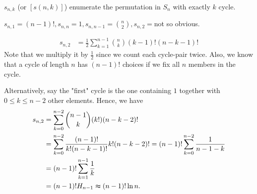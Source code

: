\begin{definition} \label{def: Stirling number for the first kind}
    \(s_{n, k}\) (or \([s(n, k)]\)) enumerate the permutation in \(S_n\) with exactly \(k\) cycle.   
\end{definition}

\begin{eg}
    \(s_{n, 1} = (n-1)!, s_{n,n} = 1, s_{n, n-1} = \binom{n}{2}, s_{n, 2} =\)not so obvious.
\end{eg}
\begin{explanation}
    \begin{align*}
        s_{n, 2} &= \frac{1}{2}\sum_{k=1}^{n-1} \binom{n}{k}(k-1)!(n-k-1)! 
    \end{align*}
    Note that we multiply it by \(\frac{1}{2}\) since we count each cycle-pair twice. Also, we know that a cycle of length \(n\) has \((n-1)!\) choices if we fix all \(n\) members in the cycle.   
    
    Alternatively, say the "first" cycle is the one containing \(1\) together with \(0 \le k \le n-2\) other elements. Hence, we have 
    \begin{align*}
        s_{n,2} &= \sum_{k=0}^{n-2} \binom{n-1}{k}(k!)(n-k-2)! \\
        &= \sum_{k=0}^{n-2} \frac{(n-1)!}{k!(n-k-1)!}k!(n-k-2)! = (n-1)! \sum_{k=0}^{n-2}\frac{1}{n-1-k} \\
        &= (n-1)! \sum_{k=1}^{n-1} \frac{1}{k} \\
        &= (n-1)! H_{n-1} \thickapprox (n-1)!\ln n.    
    \end{align*}
\end{explanation}

